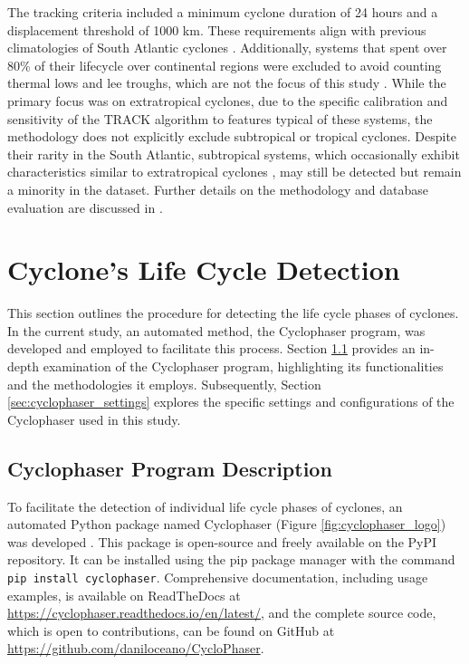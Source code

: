 The tracking criteria included a minimum cyclone duration of 24 hours and a displacement threshold of 1000 km. These requirements align with previous climatologies of South Atlantic cyclones \citep{sinclair1995climatology, gramcianinov2019properties}. Additionally, systems that spent over 80\% of their lifecycle over continental regions were excluded to avoid counting thermal lows and lee troughs, which are not the focus of this study \citep{crespo2021potential}. While the primary focus was on extratropical cyclones, due to the specific calibration and sensitivity of the TRACK algorithm to features typical of these systems, the methodology does not explicitly exclude subtropical or tropical cyclones. Despite their rarity in the South Atlantic, subtropical systems, which occasionally exhibit characteristics similar to extratropical cyclones \citep{hart2003cyclone}, may still be detected but remain a minority in the dataset. Further details on the methodology and database evaluation are discussed in \cite{gramcianinov2020analysis}.


\section{Cyclone's Life Cycle Detection}
\label{sec:cyclone_life_cycle_detection}

This section outlines the procedure for detecting the life cycle phases of cyclones. In the current study, an automated method, the Cyclophaser program, was developed and employed to facilitate this process. Section \ref{sec:cyclophaser_description} provides an in-depth examination of the Cyclophaser program, highlighting its functionalities and the methodologies it employs. Subsequently, Section \ref{sec:cyclophaser_settings} explores the specific settings and configurations of the Cyclophaser used in this study.

\subsection{Cyclophaser Program Description} \label{sec:cyclophaser_description}

To facilitate the detection of individual life cycle phases of cyclones, an automated Python package named Cyclophaser (Figure \ref{fig:cyclophaser_logo}) was developed \citep{deSouza2024}. This package is open-source and freely available on the PyPI repository. It can be installed using the pip package manager with the command \texttt{pip install cyclophaser}. Comprehensive documentation, including usage examples, is available on ReadTheDocs at \url{https://cyclophaser.readthedocs.io/en/latest/}, and the complete source code, which is open to contributions, can be found on GitHub at \url{https://github.com/daniloceano/CycloPhaser}.

